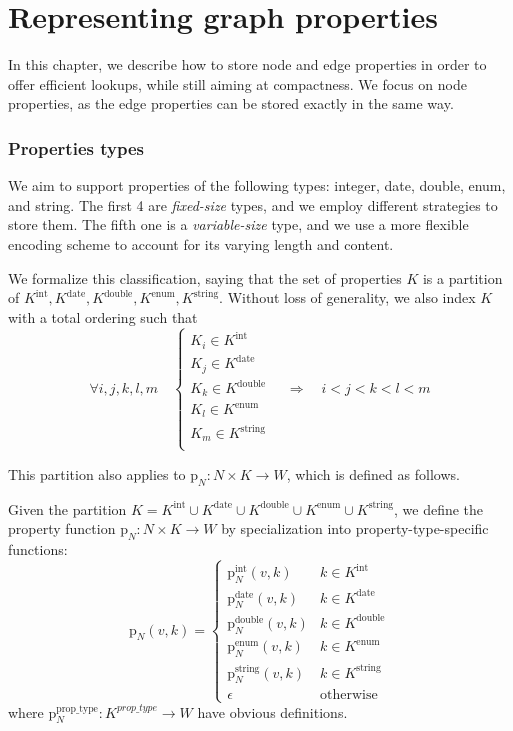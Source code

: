 \chapter{Representing graph properties}\label{chap:properties}

In this chapter, we describe how to store node and edge properties in order to offer efficient lookups, while still aiming at compactness. We focus on node properties, as the edge properties can be stored exactly in the same way.

\subsection*{Properties types}
We aim to support properties of the following types: integer, date, double, enum, and string. The first 4 are \emph{fixed-size} types, and we employ different strategies to store them. The fifth one is a \emph{variable-size} type, and we use a more flexible encoding scheme to account for its varying length and content.

We formalize this classification, saying that the set of properties $K$ is a partition of $K^\text{int}, K^\text{date}, K^\text{double}, K^\text{enum}, K^\text{string}$. Without loss of generality, we also index $K$  with a total ordering such that \[
\forall i, j, k, l, m \quad
\begin{cases}
K_i \in K^{\text{int}} \\
K_j \in K^{\text{date}} \\
K_k \in K^{\text{double}} \\
K_l \in K^{\text{enum}} \\
K_m \in K^{\text{string}} \\
\end{cases}
\quad \Rightarrow \quad i < j < k < l < m
\]


    

This partition also applies to $\mathrm p_N: N \times K \to W$, which is defined as follows.
\begin{definition}
Given the partition \( K = K^{\text{int}} \cup K^{\text{date}} \cup K^{\text{double}} \cup K^{\text{enum}} \cup K^{\text{string}} \), we define the property function \(\mathrm p_N \colon N \times K \to W\) by specialization into property-type-specific functions:
\[
\mathrm p_N(v, k) = \begin{cases}
    \mathrm p_N^\text{int}(v, k) & k \in K^\text{int} \\
    \mathrm p_N^\text{date}(v, k) & k \in K^\text{date} \\
    \mathrm p_N^\text{double}(v, k) & k \in K^\text{double} \\
    \mathrm p_N^\text{enum}(v, k) & k \in K^\text{enum} \\
    \mathrm p_N^\text{string}(v, k) & k \in K^\text{string} \\ 
    \epsilon & \text{otherwise}
\end{cases}
\]
where $\mathrm p_N^\text{prop\_type}: K^\textit{prop\_type} \to W$ have obvious definitions.
\end{definition}

